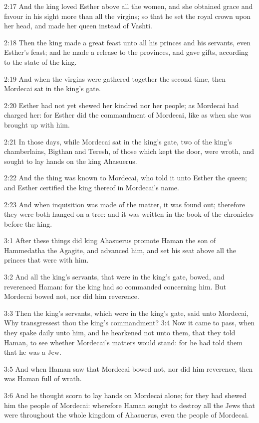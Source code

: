 2:17 And the king loved Esther above all the women, and she obtained grace and favour in his sight more than all the virgins; so that he set the royal crown upon her head, and made her queen instead of Vashti.

2:18 Then the king made a great feast unto all his princes and his servants, even Esther's feast; and he made a release to the provinces, and gave gifts, according to the state of the king.

2:19 And when the virgins were gathered together the second time, then Mordecai sat in the king's gate.

2:20 Esther had not yet shewed her kindred nor her people; as Mordecai had charged her: for Esther did the commandment of Mordecai, like as when she was brought up with him.

2:21 In those days, while Mordecai sat in the king's gate, two of the king's chamberlains, Bigthan and Teresh, of those which kept the door, were wroth, and sought to lay hands on the king Ahasuerus.

2:22 And the thing was known to Mordecai, who told it unto Esther the queen; and Esther certified the king thereof in Mordecai's name.

2:23 And when inquisition was made of the matter, it was found out; therefore they were both hanged on a tree: and it was written in the book of the chronicles before the king.

3:1 After these things did king Ahasuerus promote Haman the son of Hammedatha the Agagite, and advanced him, and set his seat above all the princes that were with him.

3:2 And all the king's servants, that were in the king's gate, bowed, and reverenced Haman: for the king had so commanded concerning him.  But Mordecai bowed not, nor did him reverence.

3:3 Then the king's servants, which were in the king's gate, said unto Mordecai, Why transgressest thou the king's commandment?  3:4 Now it came to pass, when they spake daily unto him, and he hearkened not unto them, that they told Haman, to see whether Mordecai's matters would stand: for he had told them that he was a Jew.

3:5 And when Haman saw that Mordecai bowed not, nor did him reverence, then was Haman full of wrath.

3:6 And he thought scorn to lay hands on Mordecai alone; for they had shewed him the people of Mordecai: wherefore Haman sought to destroy all the Jews that were throughout the whole kingdom of Ahasuerus, even the people of Mordecai.

